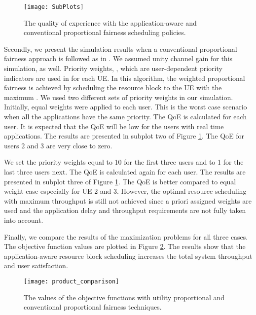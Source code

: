 \documentclass[conference]{IEEEtran}
\begin{document}
\begin{figure}
    \centering
    \texttt{[image: SubPlots]}
    \caption{The quality of experience with the application-aware and conventional proportional fairness scheduling policies.}
    \label{fig:sim:SubPlots}
\end{figure} 



Secondly, we present the simulation results when a conventional proportional fairness approach is followed as in \cite{SelfOrganizedLTE}. We assumed unity channel gain for this simulation, as well. Priority weights, , which are user-dependent priority indicators are used in \cite{SelfOrganizedLTE} for each UE. In this algorithm, the weighted proportional fairness is achieved by scheduling the resource block to the UE with the maximum . We used two different sets of priority weights in our simulation. Initially, equal weights were applied to each user. This is the worst case scenario when all the applications have the same priority. The QoE is calculated for each user. It is expected that the QoE will be low for the users with real time applications. The results are presented in subplot two of Figure \ref{fig:sim:SubPlots}. The QoE for users 2 and 3 are very close to zero.    



We set the priority weights equal to 10 for the first three users and to 1 for the last three users next. The QoE is calculated again for each user. The results are presented in subplot three of Figure \ref{fig:sim:SubPlots}. The QoE is better compared to equal weight case especially for UE 2 and 3. However, the optimal resource scheduling with maximum throughput is still not achieved since a priori assigned weights are used and the application delay and throughput requirements are not fully taken into account.  



Finally, we compare the results of the maximization problems for all three cases. The objective function values are plotted in Figure \ref{fig:sim:product_comparison}. The results show that the application-aware resource block scheduling increases the total system throughput and user satisfaction. 

\begin{figure}
    \centering
    \texttt{[image: product\_comparison]}
    \caption{The values of the objective functions with utility proportional and conventional proportional fairness techniques.}
    \label{fig:sim:product_comparison}
\end{figure} 
\end{document}
